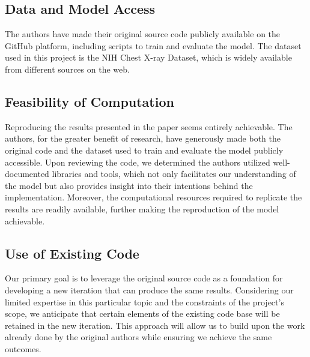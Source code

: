\documentclass[letterpaper]{article} %
\begin{document}
\subsection{Data and Model Access}

The authors have made their original source code publicly available on the GitHub
platform, including scripts to train and evaluate the model. The dataset used in this
project is the NIH Chest X-ray Dataset, which is widely available from different
sources on the web.

\subsection{Feasibility of Computation}

Reproducing the results presented in the paper seems entirely achievable. The authors, for the greater benefit of research, have generously made both the original code and the dataset used to train and evaluate the model publicly accessible. Upon reviewing the code, we determined the authors utilized well-documented libraries and tools, which not only facilitates our understanding of the model but also provides insight into their intentions behind the implementation. Moreover, the computational resources required to replicate the results are readily available, further making the reproduction of the model achievable.

\subsection{Use of Existing Code}

Our primary goal is to leverage the original source code as a foundation for developing a new iteration that can produce the same results. Considering our limited expertise in this particular topic and the constraints of the project's scope, we anticipate that certain elements of the existing code base will be retained in the new iteration. This approach will allow us to build upon the work already done by the original authors while ensuring we achieve the same outcomes.

% 
\end{document}
